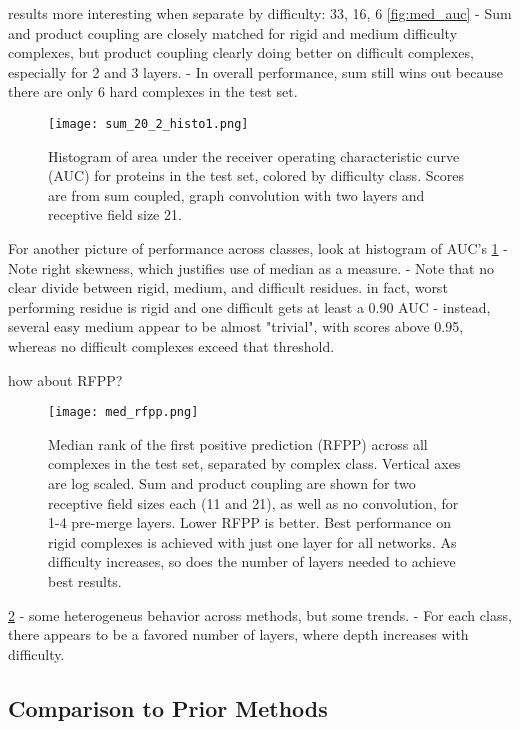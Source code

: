 results more interesting when separate by difficulty:
33, 16, 6
\ref{fig:med_auc}
	- Sum and product coupling are closely matched for rigid and medium difficulty complexes, but product coupling clearly doing better on difficult complexes, especially for 2 and 3 layers. 
	- In overall performance, sum still wins out because there are only 6 hard complexes in the test set.
	
	
\begin{figure}
	\texttt{[image: sum\_20\_2\_histo1.png]}
	\caption{Histogram of area under the receiver operating characteristic curve (AUC) for proteins in the test set, colored by difficulty class. Scores are from sum coupled, graph convolution with two layers and receptive field size 21.}
	\label{fig:histo1}
\end{figure}

For another picture of performance across classes, look at histogram of AUC's
\ref{fig:histo1}
	- Note right skewness, which justifies use of median as a measure. 
	- Note that no clear divide between rigid, medium, and difficult residues. in fact, worst performing residue is rigid and one difficult gets at least a 0.90 AUC
	- instead, several easy medium appear to be almost "trivial", with scores above 0.95, whereas no difficult complexes exceed that threshold.
	
how about RFPP?
	
\begin{figure}
	\texttt{[image: med\_rfpp.png]}
	\caption{Median rank of the first positive prediction (RFPP) across all complexes in the test set, separated by complex class. Vertical axes are log scaled. Sum and product coupling are shown for two receptive field sizes each (11 and 21), as well as no convolution, for 1-4 pre-merge layers. Lower RFPP is better. Best performance on rigid complexes is achieved with just one layer for all networks. As difficulty increases, so does the number of layers needed to achieve best results.
		\label{fig:med_rfpp}}
\end{figure}
	
\ref{fig:med_rfpp}
	- some heterogeneus behavior across methods, but some trends. 
	- For each class, there appears to be a favored number of layers, where depth increases with difficulty.



\subsection{Comparison to Prior Methods}



